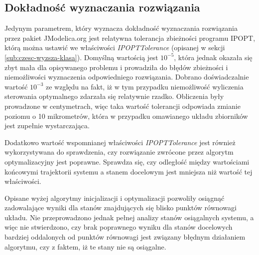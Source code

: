 
\subsection{Dokładność wyznaczania rozwiązania}
\label{sub:opt-dokladnosc}

Jedynym parametrem, który wyznacza dokładność wyznaczania rozwiązania przez pakiet JModelica.org jest relatywna tolerancja zbieżności programu IPOPT, którą można ustawić we właściwości \emph{IPOPTTolerance} (opisanej w sekcji \ref{sub:czesc-wyzsza-klasa}). Domyślną wartością jest $10^{-5}$, która jednak okazała się zbyt mała dla opisywanego problemu i prowadziła do błędów zbieżności i niemożliwości wyznaczenia odpowiedniego rozwiązania. Dobrano doświadczalnie wartość $10^{-3}$ ze względu na fakt, iż w tym przypadku niemożliwość wyliczenia sterowania optymalnego zdarzała się relatywnie rzadko. Obliczenia były prowadzone w centymetrach, więc taka wartość tolerancji odpowiada zmianie poziomu o 10 mikrometrów, która w przypadku omawianego układu zbiorników jest zupełnie wystarczająca.

Dodatkowo wartość wspomnianej właściwości \emph{IPOPTTolerance} jest również wykorzystywana do sprawdzenia, czy rozwiązanie zwrócone przez algorytm optymalizacyjny jest poprawne. Sprawdza się, czy odległość między wartościami końcowymi trajektorii systemu a stanem docelowym jest mniejsza niż wartość tej właściwości.

Opisane wyżej algorytmy inicjalizacji i optymalizacji pozwoliły osiągnąć zadowalające wyniki dla stanów znajdujących się blisko punktów równowagi układu. Nie przeprowadzono jednak pełnej analizy stanów osiągalnych systemu, a więc nie stwierdzono, czy brak poprawnego wyniku dla stanów docelowych bardziej oddalonych od punktów równowagi jest związany błędnym działaniem algorytmu, czy z faktem, iż te stany nie są osiągalne.
